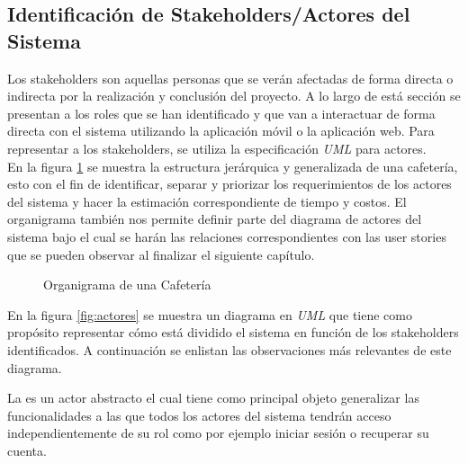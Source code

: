 	
\subsection{Identificación de Stakeholders/Actores del Sistema}

Los stakeholders son aquellas personas que se verán afectadas de forma directa o indirecta por la realización y conclusión del proyecto. A lo largo de está sección se presentan a los roles que se han identificado y que van a interactuar de forma directa con el sistema utilizando la aplicación móvil o la aplicación web. Para representar a los stakeholders, se utiliza la especificación \textit{UML} para actores.\\

En la figura \ref{fig:organigrama} se muestra la estructura jerárquica y generalizada de una cafetería, esto con el fin de identificar, separar y priorizar los requerimientos de los actores del sistema y hacer la estimación correspondiente de tiempo y costos. El organigrama también nos permite definir parte del diagrama de actores del sistema bajo el cual se harán las relaciones correspondientes con las user stories que se pueden observar al finalizar el siguiente capítulo.

\begin{figure}[hbtp!]
	\begin{center}
		\caption{Organigrama de una Cafetería}
		\label{fig:organigrama}
	\end{center}
\end{figure}


En la figura \ref{fig:actores} se muestra un diagrama en \textit{UML} que tiene como propósito representar cómo está dividido el sistema en función de los stakeholders identificados. A continuación se enlistan las observaciones más relevantes de este diagrama.
\begin{Citemize}
	\item La  es un actor abstracto el cual tiene como principal objeto generalizar las funcionalidades a las que todos los actores del sistema tendrán acceso independientemente de su rol como por ejemplo iniciar sesión o recuperar su cuenta.
\end{Citemize}

